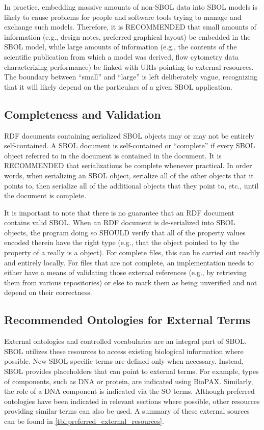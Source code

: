In practice, 
embedding massive amounts of non-SBOL data into SBOL models is likely
to cause problems for people and software tools trying to manage and
exchange such models.  Therefore, it is RECOMMENDED that small amounts of information (e.g., design notes, preferred graphical layout) be embedded in the SBOL model, while large amounts of information (e.g., the contents of the scientific publication from which a model was derived, flow cytometry data characterizing performance) be linked with URIs pointing to external resources.  The boundary between ``small'' and ``large'' is left deliberately vague, recognizing that it will likely depend on the particulars of a given SBOL application.

\subsection{Completeness and Validation}

RDF documents containing serialized SBOL objects may or may not be
entirely self-contained.  A SBOL document is self-contained or ``complete'' if every SBOL object referred to in the document is contained in the document.  It is RECOMMENDED that serializations be complete whenever practical.  In order words, when serializing an SBOL object, serialize all of the other objects that it points to, then serialize all of the additional objects that they point to, etc., until the document is complete.

It is important to note that there is no guarantee that an RDF document
contains valid SBOL. When an RDF document is de-serialized into SBOL
objects, the program doing so SHOULD verify that all of the property
values encoded therein have the right type (e.g., that the object
pointed to by the  property of a
 really is a  object).
For complete files, this can be carried out readily and entirely
locally.  For files that are not complete, an implementation needs to
either have a means of validating those external references (e.g., by
retrieving them from various repositories) or else to mark them as
being unverified and not depend on their correctness.

\subsection{Recommended Ontologies for External Terms}

External ontologies and controlled vocabularies are an integral part of SBOL. SBOL utilizes these resources to access existing biological information where possible. New SBOL specific terms are defined only when necessary. Instead, SBOL provides placeholders that can point to external terms. For example, types of components, such as DNA or protein, are indicated using BioPAX. Similarly, the role of a DNA component is indicated via the SO terms. Although preferred ontologies have been indicated in relevant sections where possible, other resources providing similar terms can also be used. A summary of these external sources can be found in \ref{tbl:preferred_external_resources}.

